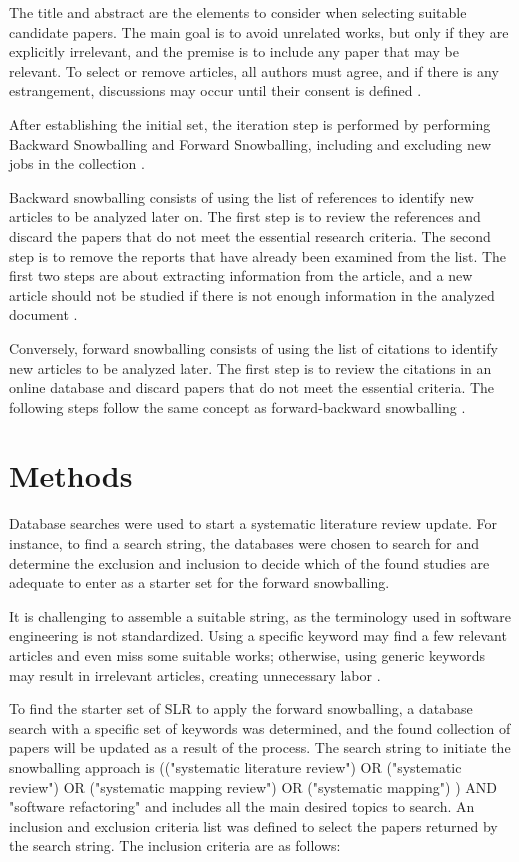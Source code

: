 The title and abstract are the elements to consider when selecting suitable candidate papers. The main goal is to avoid unrelated works, but only if they are explicitly irrelevant, and the premise is to include any paper that may be relevant. To select or remove articles, all authors must agree, and if there is any estrangement, discussions may occur until their consent is defined \textcite{Kitchenham2013}.

After establishing the initial set, the iteration step is performed by performing Backward Snowballing and Forward Snowballing, including and excluding new jobs in the collection \cite{Wohlin2014}.

Backward snowballing consists of using the list of references to identify new articles to be analyzed later on. The first step is to review the references and discard the papers that do not meet the essential research criteria. The second step is to remove the reports that have already been examined from the list. The first two steps are about extracting information from the article, and a new article should not be studied if there is not enough information in the analyzed document \cite{Wohlin2014}.

Conversely, forward snowballing consists of using the list of citations to identify new articles to be analyzed later. The first step is to review the citations in an online database and discard papers that do not meet the essential criteria. The following steps follow the same concept as forward-backward snowballing \cite{Felizardo2016}.

\section{Methods}
\label{sec-methods}
Database searches were used to start a systematic literature review update. For instance, to find a search string, the databases were chosen to search for and determine the exclusion and inclusion to decide which of the found studies are adequate to enter as a starter set for the forward snowballing.

It is challenging to assemble a suitable string, as the terminology used in software engineering is not standardized. Using a specific keyword may find a few relevant articles and even miss some suitable works; otherwise, using generic keywords may result in irrelevant articles, creating unnecessary labor \cite{Wohlin2014}.

To find the starter set of SLR to apply the forward snowballing, a database search with a specific set of keywords was determined, and the found collection of papers will be updated as a result of the process. The search string to initiate the snowballing approach is (("systematic literature review") OR ("systematic review") OR ("systematic mapping review") OR ("systematic mapping") ) AND "software refactoring" and includes all the main desired topics to search. An inclusion and exclusion criteria list was defined to select the papers returned by the search string. The inclusion criteria are as follows:

